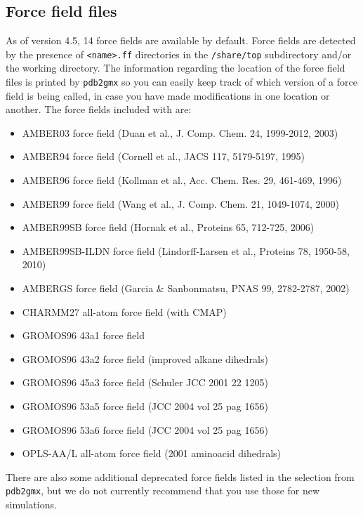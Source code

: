 \subsection{Force field files}
\label{subsec:fffiles}
As of {\gromacs} version 4.5, 14 force fields are available by default.
Force fields are detected by the presence of {\tt <name>.ff} directories
in the {\gromacs} {\tt /share/top} subdirectory and/or the working directory.  
The information regarding the location of the force field files is printed
by {\tt pdb2gmx} so you can easily keep track of which version of a force field
is being called, in case you have made modifications in one location or another.
The force fields included with {\gromacs} are:

{\small
\begin{itemize}
 \item AMBER03 force field (Duan et al., J. Comp. Chem. 24, 1999-2012, 2003) 
 \item AMBER94 force field (Cornell et al., JACS 117, 5179-5197, 1995) 
 \item AMBER96 force field (Kollman et al., Acc. Chem. Res. 29, 461-469, 1996) 
 \item AMBER99 force field (Wang et al., J. Comp. Chem. 21, 1049-1074, 2000) 
 \item AMBER99SB force field (Hornak et al., Proteins 65, 712-725, 2006) 
 \item AMBER99SB-ILDN force field (Lindorff-Larsen et al., Proteins 78, 1950-58, 2010) 
 \item AMBERGS force field (Garcia \& Sanbonmatsu, PNAS 99, 2782-2787, 2002) 
 \item CHARMM27 all-atom force field (with CMAP) 
 \item GROMOS96 43a1 force field 
 \item GROMOS96 43a2 force field (improved alkane dihedrals) 
 \item GROMOS96 45a3 force field (Schuler JCC 2001 22 1205) 
 \item GROMOS96 53a5 force field (JCC 2004 vol 25 pag 1656) 
 \item GROMOS96 53a6 force field (JCC 2004 vol 25 pag 1656) 
 \item OPLS-AA/L all-atom force field (2001 aminoacid dihedrals) 
\end{itemize}} 
 
There are also some additional deprecated force fields listed in the selection from
{\tt pdb2gmx}, but we do not currently recommend that you use those for new simulations.
 
